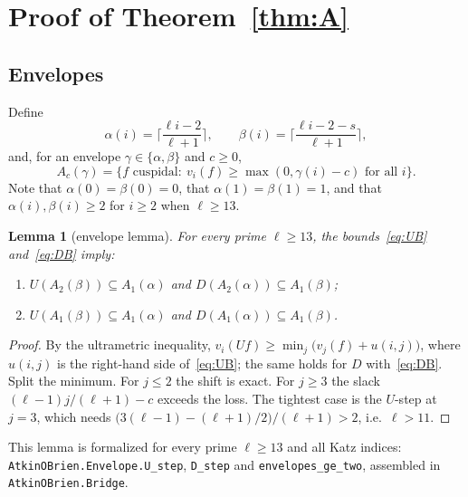 \documentclass[11pt]{amsart}
\newcommand{\lean}[1]{\texttt{#1}}
\theoremstyle{plain}
\newtheorem{lemma}[theorem]{Lemma}
\theoremstyle{definition}
\numberwithin{equation}{section}
\begin{document}
\section{Proof of Theorem~\ref{thm:A}}\label{sec:proofA}

\subsection{Envelopes}
Define
\[
  \alpha(i)=\Big\lceil\frac{\ell i-2}{\ell+1}\Big\rceil,\qquad \beta(i)=\Big\lceil\frac{\ell i-2-s}{\ell+1}\Big\rceil,
\]
and, for an envelope $\gamma\in\{\alpha,\beta\}$ and $c\ge0$,
\[
  A_c(\gamma)=\{f\text{ cuspidal}:\ v_i(f)\ge\max(0,\gamma(i)-c)\text{ for all }i\}.
\]
Note that $\alpha(0)=\beta(0)=0$, that $\alpha(1)=\beta(1)=1$, and that $\alpha(i),\beta(i)\ge2$ for $i\ge2$ when $\ell\ge 13$.

\begin{lemma}[envelope lemma]\label{lem:env}
For every prime $\ell\ge13$, the bounds~\eqref{eq:UB} and~\eqref{eq:DB} imply:
\begin{enumerate}[label=(\arabic*)]
\item $U(A_2(\beta))\subseteq A_1(\alpha)$ and $D(A_2(\alpha))\subseteq A_1(\beta)$;
\item $U(A_1(\beta))\subseteq A_1(\alpha)$ and $D(A_1(\alpha))\subseteq A_1(\beta)$.
\end{enumerate}
\end{lemma}
\begin{proof}
By the ultrametric inequality, $v_i(Uf)\ge\min_j\big(v_j(f)+u(i,j)\big)$, where $u(i,j)$ is the right-hand side
of~\eqref{eq:UB}; the same holds for $D$ with~\eqref{eq:DB}. Split the minimum. For $j\le2$ the shift is exact. For
$j\ge3$ the slack $(\ell-1)j/(\ell+1)-c$ exceeds the loss. The tightest case is the $U$-step at $j=3$, which needs
$\big(3(\ell-1)-(\ell+1)/2\big)/(\ell+1)>2$, i.e.\ $\ell>11$.
\end{proof}
This lemma is formalized for every prime $\ell\ge13$ and all Katz indices: \lean{AtkinOBrien.Envelope.U\_step},
\lean{D\_step} and \lean{envelopes\_ge\_two}, assembled in \lean{AtkinOBrien.Bridge}.
\end{document}

